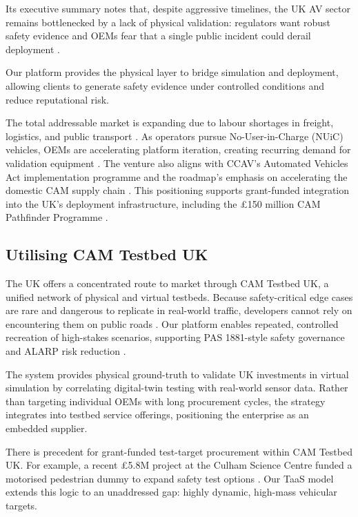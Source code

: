 \documentclass[11pt, a4paper]{report}
\numberwithin{equation}{section}
\begin{document}
\begin{refsection}
Its executive summary notes that, despite aggressive timelines, the UK AV sector remains bottlenecked by a lack of physical validation: regulators want robust safety evidence and OEMs fear that a single public incident could derail deployment \cite[p.~5,11,14]{cracknell_2023}.

Our platform provides the physical layer to bridge simulation and deployment, allowing clients to generate safety evidence under controlled conditions and reduce reputational risk.

The total addressable market is expanding due to labour shortages in freight, logistics, and public transport \cite[p.~6]{wef_2021}. As operators pursue No-User-in-Charge (NUiC) vehicles, OEMs are accelerating platform iteration, creating recurring demand for validation equipment \cite[p.~9,11,17]{cracknell_2023}. The venture also aligns with CCAV’s Automated Vehicles Act implementation programme \cite{lawcom_avs_2024} and the roadmap’s emphasis on accelerating the domestic CAM supply chain \cite[p.~9,10,19]{cracknell_2023}. This positioning supports grant-funded integration into the UK’s deployment infrastructure, including the £150 million CAM Pathfinder Programme \cite{pockney_2026}.

\subsection{Utilising CAM Testbed UK}
\label{sec:cam_testbed_uk}
\label{sec:ch7-cam-testbed}
The UK offers a concentrated route to market through CAM Testbed UK, a unified network of physical and virtual testbeds. Because safety-critical edge cases are rare and dangerous to replicate in real-world traffic, developers cannot rely on encountering them on public roads \cite[p.~12]{chen_2024}. Our platform enables repeated, controlled recreation of high-stakes scenarios, supporting PAS 1881-style safety governance and ALARP risk reduction \cite[p.~1]{pas1881}.

The system provides physical ground-truth to validate UK investments in virtual simulation by correlating digital-twin testing with real-world sensor data. Rather than targeting individual OEMs with long procurement cycles, the strategy integrates into testbed service offerings, positioning the enterprise as an embedded supplier.

There is precedent for grant-funded test-target procurement within CAM Testbed UK. For example, a recent £5.8M project at the Culham Science Centre funded a motorised pedestrian dummy to expand safety test options \cite[p.~2]{culham_2024}. Our TaaS model extends this logic to an unaddressed gap: highly dynamic, high-mass vehicular targets.


\end{refsection}
\end{document}
